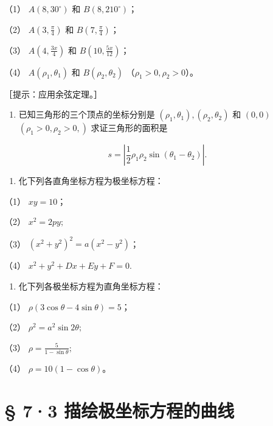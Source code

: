 （1） \(A(8, 30^{\circ})\) 和 \(B(8, 210^{\circ})\)；

（2） \(A\left(3, \frac{\pi}{4}\right)\) 和
\(B\left(7, \frac{\pi}{4}\right)\)；

（3） \(A\left(4, \frac{3x}{4}\right)\) 和
\(B\left(10, \frac{5x}{12}\right)\)；

（4） \(A(\rho_1, \theta_1)\) 和 \(B(\rho_2, \theta_2)\)
（\(\rho_1 > 0, \rho_2 > 0\)）。

［提示：应用余弦定理。］

\begin{enumerate}
\def\labelenumi{\arabic{enumi}.}
\setcounter{enumi}{1}
\tightlist
\item
  已知三角形的三个顶点的坐标分别是
  \((\rho_{1}, \theta_{1}), (\rho_{2}, \theta_{2})\) 和 \((0, 0)\)
  \((\rho_{1} > 0, \rho_{2} > 0,)\) 求证三角形的面积是
\end{enumerate}

\[
s = \left| \frac {1}{2} \rho_{1} \rho_{2} \sin (\theta_{1} - \theta_{2}) \right|.
\]

\begin{enumerate}
\def\labelenumi{\arabic{enumi}.}
\setcounter{enumi}{2}
\tightlist
\item
  化下列各直角坐标方程为极坐标方程：
\end{enumerate}

（1） \(xy = 10\)；

（2） \(x^{2} = 2py;\)

（3） \((x^{2} + y^{2})^{2} = a(x^{2} - y^{2})\)；

（4） \(x^{2} + y^{2} + Dx + Ey + F = 0.\)

\begin{enumerate}
\def\labelenumi{\arabic{enumi}.}
\setcounter{enumi}{3}
\tightlist
\item
  化下列各极坐标方程为直角坐标方程：
\end{enumerate}

（1） \(\rho(3\cos\theta - 4\sin\theta) = 5\)；

（2） \(\rho^2 = a^2\sin 2\theta;\)

（3） \(\rho = \frac{5}{1 - \sin\theta};\)

（4） \(\rho = 10(1 - \cos \theta)\)。

\section{§ 7·3
描绘极坐标方程的曲线}\label{ux63cfux7ed8ux6781ux5750ux6807ux65b9ux7a0bux7684ux66f2ux7ebf}

